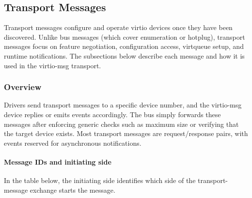 \subsection{Transport Messages}\label{sec:Virtio Transport Options / Virtio Over Messages / Transport Messages}

Transport messages configure and operate virtio devices once they have been
discovered. Unlike bus messages (which cover enumeration or hotplug), transport
messages focus on feature negotiation, configuration access, virtqueue setup,
and runtime notifications. The subsections below describe each message and how
it is used in the virtio-msg transport.

\subsubsection{Overview}
\label{sec:Virtio Transport Options / Virtio Over Messages / Transport Messages / Overview}

Drivers send transport messages to a specific device number, and the virtio-msg
device replies or emits events accordingly. The bus simply forwards these
messages after enforcing generic checks such as maximum size or verifying that
the target device exists. Most transport messages are request/response pairs,
with events reserved for asynchronous notifications.

\paragraph{Message IDs and initiating side}

In the table below, the initiating side identifies which side of the
transport-message exchange starts the message.

